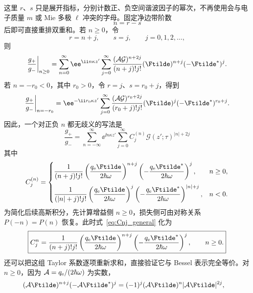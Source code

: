 这里 $r$、$s$ 只是展开指标，分别计数正、负空间谐波因子的幂次，不再使用会与电子质量 $m$ 或 Mie 多极 $\ell$ 冲突的字母。固定净边带阶数
\begin{equation}
n=r-s
\label{eq:net-sideband-rs}
\end{equation}
后即可直接重排双重和。若 $n\ge0$，令
\begin{equation}
r=n+j,\qquad s=j,\qquad j=0,1,2,\ldots,
\end{equation}
则
\begin{align}
\frac{g_+}{g_-}\bigg|_{n\ge0}
=\sum_{n=0}^{\infty}\ee^{\ii n\kappa z'}
\sum_{j=0}^{\infty}
\frac{(\mathcal A\mathcal G)^{n+2j}}{(n+j)!j!}
(\Ftilde)^{n+j}(-\Ftilde^*)^j.
\end{align}
若 $n=-r_0<0$，其中 $r_0>0$，令 $r=j$、$s=r_0+j$，得到
\begin{align}
\frac{g_+}{g_-}\bigg|_{n=-r_0}
=\ee^{-\ii r_0\kappa z'}
\sum_{j=0}^{\infty}
\frac{(\mathcal A\mathcal G)^{r_0+2j}}{(r_0+j)!j!}
(\Ftilde)^j(-\Ftilde^*)^{r_0+j}.
\end{align}
因此，一个对正负 \(n\) 都无歧义的写法是
\begin{equation}
\boxed{
\frac{g_+}{g_-}
=\sum_{n=-\infty}^{\infty}\ee^{\ii n\kappa z'}
\sum_{j=0}^{\infty}C_j^{(n)}
\mathcal G(z';\tau)^{|n|+2j}}
\label{eq:taylor-sideband-coefficient}
\end{equation}
其中
\begin{equation}
C_j^{(n)}=
\begin{cases}
\displaystyle
\frac{1}{(n+j)!j!}
\left(\frac{q_{\rm e}\Ftilde}{2\hbar\omega}\right)^{n+j}
\left(-\frac{q_{\rm e}\Ftilde^*}{2\hbar\omega}\right)^j,
& n\ge0,\\[1.2em]
\displaystyle
\frac{1}{(|n|+j)!j!}
\left(\frac{q_{\rm e}\Ftilde}{2\hbar\omega}\right)^j
\left(-\frac{q_{\rm e}\Ftilde^*}{2\hbar\omega}\right)^{|n|+j},
& n<0.
\end{cases}
\label{eq:Cnj_general}
\end{equation}
为简化后续高斯积分，先计算增益侧 \(n\ge0\)，损失侧可由对称关系 \(P(-n)=P(n)\) 恢复。此时式~\eqref{eq:Cnj_general} 化为
\begin{equation}
\boxed{
C_j^{n}
=\frac{1}{(n+j)!j!}
\left(\frac{q_{\rm e}\Ftilde}{2\hbar\omega}\right)^{n+j}
\left(-\frac{q_{\rm e}\Ftilde^*}{2\hbar\omega}\right)^j,
\qquad n\ge0.}
\label{eq:Cnj-positive}
\end{equation}
还可以把这组 Taylor 系数逐项重新求和，直接验证它与 Bessel 表示完全等价。对 $n\ge0$，因为 $\mathcal A=q_{\rm e}/(2\hbar\omega)$ 为实数，
\begin{align}
(\mathcal A\Ftilde)^{n+j}(-\mathcal A\Ftilde^*)^j
&=(-1)^j(\mathcal A\Ftilde)^n
|\mathcal A\Ftilde|^{2j},
\end{align}
